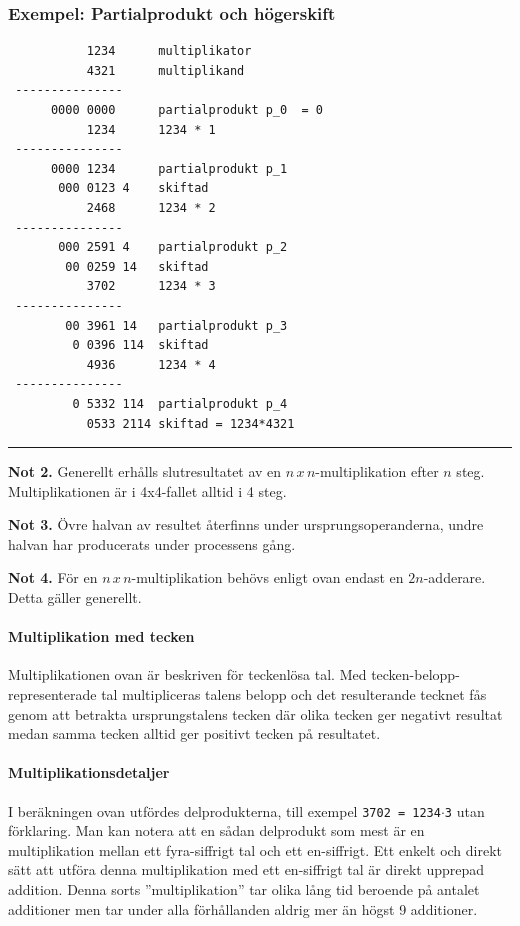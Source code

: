 \documentclass[oneside,10pt,a4paper,swedish]{scrbook}
\newcommand{\slutex}{\vspace{-8mm}\begin{flushright} \rule{1ex}{1ex} \end{flushright}}
\newcommand{\asm}[1]{\texttt{#1}}
\begin{document}
\subsubsection{Exempel: Partialprodukt och högerskift}
\begin{center}
\begin{lstlisting}
           1234	     multiplikator
           4321      multiplikand
 ---------------
      0000 0000      partialprodukt p_0  = 0
           1234      1234 * 1
 ---------------
      0000 1234      partialprodukt p_1
       000 0123 4    skiftad      
           2468      1234 * 2
 ---------------
       000 2591 4    partialprodukt p_2
        00 0259 14   skiftad
           3702      1234 * 3
 ---------------     
        00 3961 14   partialprodukt p_3
         0 0396 114  skiftad
           4936      1234 * 4
 ---------------
         0 5332 114  partialprodukt p_4 
           0533 2114 skiftad = 1234*4321
\end{lstlisting}
\end{center}
\slutex

\textbf{Not 2.} Generellt erhålls slutresultatet  av en $n\,x\,n$-multiplikation efter $n$ steg. Multiplikationen är i 4x4-fallet alltid i 4 steg.

\textbf{Not 3.} Övre halvan av resultet återfinns under ursprungsoperanderna, undre halvan har producerats under processens gång.

\textbf{Not 4.} För en  $n\,x\,n$-multiplikation behövs enligt ovan endast en $2n$-adderare. Detta gäller generellt.

\paragraph{Multiplikation med tecken} Multiplikationen ovan är beskriven för teckenlösa tal. Med tecken-belopp-representerade tal multipliceras talens belopp och det resulterande tecknet fås genom att betrakta ursprungstalens tecken där olika tecken ger negativt resultat medan samma tecken alltid ger positivt tecken på resultatet.

\paragraph{Multiplikationsdetaljer} I beräkningen ovan utfördes delprodukterna, till exempel \asm{3702 = 1234}$\cdot$\asm{3} utan förklaring. Man kan notera att en sådan delprodukt som mest är en multiplikation mellan ett fyra-siffrigt tal och ett en-siffrigt. Ett enkelt och direkt sätt att utföra denna multiplikation med ett en-siffrigt tal är direkt upprepad addition. Denna sorts ''multiplikation'' tar olika lång tid beroende på antalet additioner men tar under alla förhållanden aldrig mer än högst 9 additioner.
\end{document}
